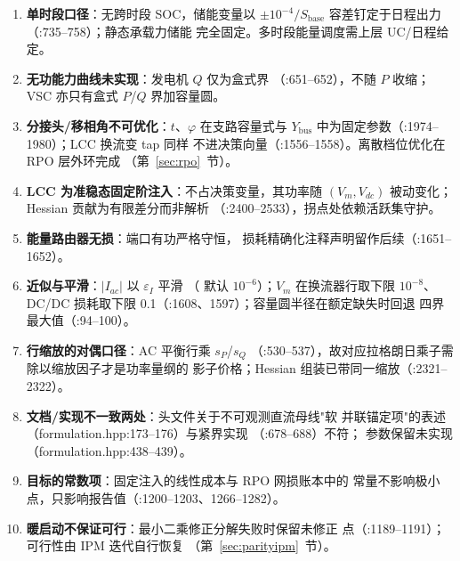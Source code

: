 \begin{enumerate}
\item \textbf{单时段口径}：无跨时段 SOC，储能变量以 $\pm10^{-4}/
  S_{\mathrm{base}}$ 容差钉定于日程出力（:735--758）；静态承载力储能
  完全固定。多时段能量调度需上层 UC/日程给定。
\item \textbf{无功能力曲线未实现}：发电机 $Q$ 仅为盒式界
  （:651--652），不随 $P$ 收缩；VSC 亦只有盒式 $P$/$Q$ 界加容量圆。
\item \textbf{分接头/移相角不可优化}：$t$、$\varphi$ 在支路容量式与
  $Y_{\mathrm{bus}}$ 中为固定参数（:1974--1980）；LCC 换流变 tap 同样
  不进决策向量（:1556--1558）。离散档位优化在 RPO 层外环完成
  （第~\ref{sec:rpo}~节）。
\item \textbf{LCC 为准稳态固定阶注入}：不占决策变量，其功率随
  $(V_m,V_{dc})$ 被动变化；Hessian 贡献为有限差分而非解析
  （:2400--2533），拐点处依赖活跃集守护。
\item \textbf{能量路由器无损}：端口有功严格守恒，
  损耗精确化注释声明留作后续（:1651--1652）。
\item \textbf{近似与平滑}：$|I_{ac}|$ 以 $\varepsilon_I$ 平滑
  （ 默认 $10^{-6}$）；$V_m$ 在换流器行取下限 $10^{-8}$、
  DC/DC 损耗取下限 0.1（:1608、1597）；容量圆半径在额定缺失时回退
  四界最大值（:94--100）。
\item \textbf{行缩放的对偶口径}：AC 平衡行乘 $s_P$/$s_Q$
  （:530--537），故对应拉格朗日乘子需除以缩放因子才是功率量纲的
  影子价格；Hessian 组装已带同一缩放（:2321--2322）。
\item \textbf{文档/实现不一致两处}：头文件关于不可观测直流母线"软
  并联锚定项"的表述（formulation.hpp\allowbreak :173--176）与紧界实现
  （:678--688）不符； 参数保留未实现
  （formulation.hpp:438--439）。
\item \textbf{目标的常数项}：固定注入的线性成本与 RPO 网损账本中的
  常量不影响极小点，只影响报告值（:1200--1203、1266--1282）。
\item \textbf{暖启动不保证可行}：最小二乘修正分解失败时保留未修正
  点（:1189--1191）；可行性由 IPM 迭代自行恢复
  （第~\ref{sec:parityipm}~节）。
\end{enumerate}
